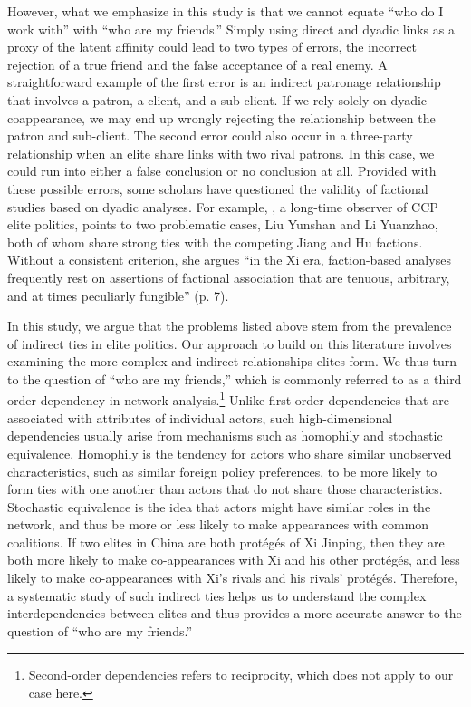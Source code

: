 \documentclass[11pt,english]{article}
\begin{document}
\begin{flushleft}
However, what we emphasize in this study is that we cannot equate ``who do I work with'' with ``who are my friends.'' Simply using direct and dyadic links as a proxy of the latent affinity could lead to two types of errors, the incorrect rejection of a true friend and the false acceptance of a real enemy. A straightforward example of the first error is an indirect patronage relationship that involves a patron, a client, and a sub-client. If we rely solely on dyadic coappearance, we may end up wrongly rejecting the relationship between the patron and sub-client. The second error could also occur in a three-party relationship when an elite share links with two rival patrons. In this case, we could run into either a false conclusion or no conclusion at all. Provided with these possible errors, some scholars have questioned the validity of factional studies based on dyadic analyses. For example, \citet{Miller2015d}, a long-time observer of CCP elite politics, points to two problematic cases, Liu Yunshan and Li Yuanzhao, both of whom share strong ties with the competing Jiang and Hu factions. Without a consistent criterion, she argues ``in the Xi era, faction-based analyses frequently rest on assertions of factional association that are tenuous, arbitrary, and at times peculiarly fungible'' (p. 7).

In this study, we argue that the problems listed above stem from the prevalence of indirect ties in elite politics. Our approach to build on this literature involves examining the more complex and indirect relationships elites form. We thus turn to the question of ``who are my friends,'' which is commonly referred to as a third order dependency in network analysis.\footnote{Second-order dependencies refers to reciprocity, which does not apply to our case here.} Unlike first-order dependencies that are associated with attributes of individual actors, such high-dimensional dependencies usually arise from mechanisms such as homophily and stochastic equivalence. Homophily is the tendency for actors who share similar unobserved characteristics, such as similar foreign policy preferences, to be more likely to form ties with one another  than actors that do not share those characteristics. Stochastic equivalence is the idea that actors might have similar roles in the network, and thus be more or less likely to make appearances with common coalitions. If two elites in China are both prot\'{e}g\'{e}s of Xi Jinping, then they are both more likely to make co-appearances with Xi and his other prot\'{e}g\'{e}s, and less likely to make co-appearances with Xi's rivals and his rivals' prot\'{e}g\'{e}s. Therefore, a systematic study of such indirect ties helps us to understand the complex interdependencies between elites and thus provides a more accurate answer to the question of ``who are my friends.''


\end{flushleft}
\end{document}
